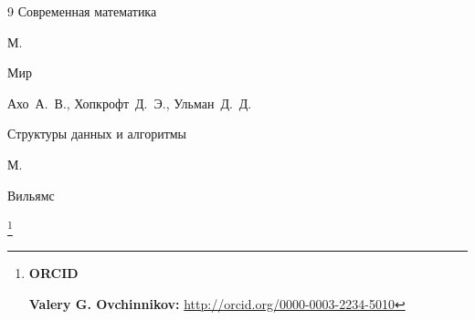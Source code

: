 \begin{thebibliography}{9}
\book Современная математика

\publaddr М.

\publ Мир






\by Ахо~А.~В., Хопкрофт~Д.~Э., Ульман~Д.~Д.

\book Структуры данных и алгоритмы

\publaddr М.

\publ Вильямс





\end{thebibliography}



\RuDate





\bigskip



\makeentitle



{

\thanks{{\bf ORCID} 



{\bf Valery G. Ovchinnikov:} \url{http://orcid.org/0000-0003-2234-5010}



}}







\EngRef





